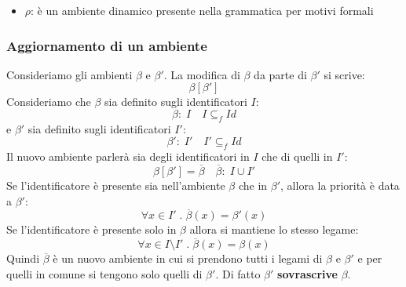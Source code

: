 \documentclass[a4paper]{article}
\begin{document}
\begin{itemize}
\begin{figure}[H]
      \caption{Composizione privata \( D_1 \texttt{ in } D_2 \)}
    \end{figure}

    \begin{example}
      Consideriamo ad esempio il seguente codice:
\begin{lstlisting}
const x: int = 3;
const x: int = 5 in y: int = 6 * x;
const z: int = x + y;
\end{lstlisting}
      Osserviamo i valori di questo codice:
      \begin{enumerate}
        \item A riga 1 il valore assegnato a \( x \) è \( \rho = [x \mapsto 3] \) 
        \item A riga 2 il valore assegnato a \( x \) è \( \rho_1 = [x \mapsto 5] \) e
          viene usata per elaborare \( y \) che assume il valore
          \( \rho_2 = [y \mapsto 6 * 5 = 30] \)
        \item A riga 3 viene usato il valore di \( x \) dichiarato a riga 1 e il valore
          di \( y \) dichiarato a riga 2, cioè \( \rho[\rho_2] = [x \mapsto 3, y \mapsto 30] \),
          per elaborare \( z \) che assume il valore \( \rho_3 = [x \mapsto 3, y \mapsto 30, z \mapsto 3 + 30 = 33] \)
      \end{enumerate}
    \end{example}

  \item \( \rho \): è un ambiente dinamico presente nella grammatica per motivi formali
\end{itemize}

\subsubsection{Aggiornamento di un ambiente}
Consideriamo gli ambienti \( \beta \) e \( \beta' \). La modifica di \( \beta \) da
parte di \( \beta' \) si scrive:
\[
  \beta \left[ \beta' \right]
\] 
Consideriamo che \( \beta \) sia definito sugli identificatori \( I \):
\[
  \beta:\; I \quad I \subseteq_f Id
\] 
e \( \beta' \) sia definito sugli identificatori \( I' \):
\[
  \beta':\; I' \quad I' \subseteq_f Id
\] 
Il nuovo ambiente parlerà sia degli identificatori in \( I \) che di quelli in \( I' \):
\[
  \beta \left[ \beta' \right] = \overline{\beta} \quad \overline{\beta}:\; I \cup I'
\] 
Se l'identificatore è presente sia nell'ambiente \( \beta \) che in \( \beta' \), allora
la priorità è data a \( \beta' \):
\[
  \forall x \in I' \;.\; \overline{\beta}(x) = \beta'(x)
\] 
Se l'identificatore è presente solo in \( \beta \) allora si mantiene lo stesso legame:
\[
  \forall x \in I \setminus I' \;.\; \overline{\beta}(x) = \beta(x)
\] 
Quindi \( \overline{\beta} \) è un nuovo ambiente in cui si prendono tutti i legami
di \( \beta \) e \( \beta' \) e per quelli in comune si tengono solo quelli di
\( \beta' \). Di fatto \( \beta' \) \textbf{sovrascrive} \( \beta \).
\end{document}
